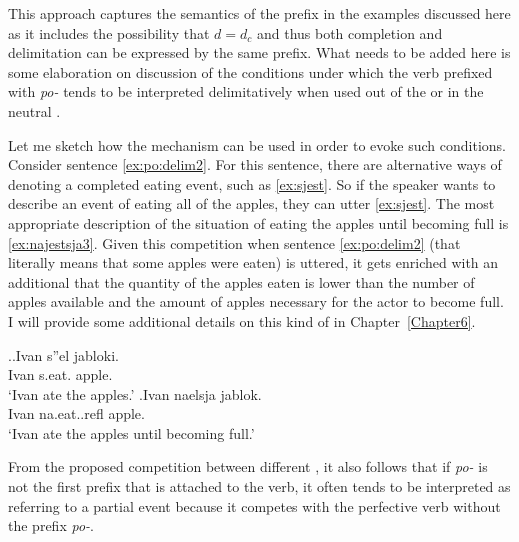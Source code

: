 This approach captures the semantics of the prefix in the examples discussed here as it includes the possibility that $d = d_c$ and thus both completion and delimitation can be expressed by the same prefix. What needs to be added here is some elaboration on discussion of the conditions under which the verb prefixed with \textit{po-} tends to be interpreted delimitatively when used out of the  or in the neutral .

Let me sketch how the  mechanism can be used in order to evoke such conditions. Consider sentence \ref{ex:po:delim2}. For this sentence, there are alternative ways of denoting a completed eating event, such as \ref{ex:sjest}. So if the speaker wants to describe an event of eating all of the apples, they can utter \ref{ex:sjest}. The most appropriate description of the situation of eating the apples until becoming full is \ref{ex:najestsja3}. Given this competition when sentence \ref{ex:po:delim2} (that literally means that some apples were eaten) is uttered, it gets enriched with an additional  that the quantity of the apples eaten is lower than the number of apples available and the amount of apples necessary for the actor to become full. I will provide some additional details on this kind of  in Chapter~\ref{Chapter6}.

\ex.\ag.\label{ex:sjest}Ivan s''el jabloki.\\
Ivan s.eat. apple.\\
\trans `Ivan ate the apples.'
\bg.\label{ex:najestsja3}Ivan naelsja jablok.\\
Ivan na.eat..refl apple.\\
\trans `Ivan ate the apples until becoming full.'

From the proposed competition between different , it also follows that if \textit{po-} is not the first prefix that is attached to the verb, it often tends to be interpreted as referring to a partial event because it competes with the perfective verb without the prefix \textit{po-}.


